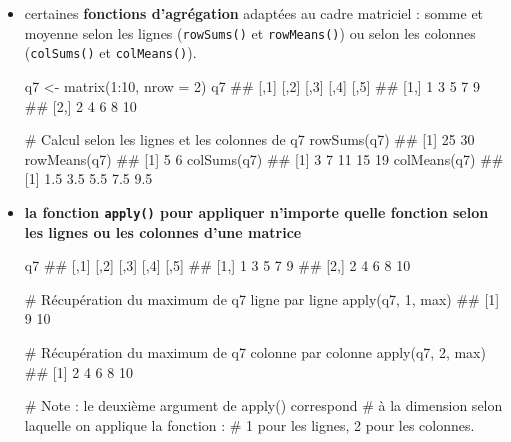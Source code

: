 \documentclass[12pt,twosided, notitlepage]{book}
\newenvironment{Shaded}{}{}
\newcommand{\KeywordTok}[1]{\textcolor[rgb]{0.00,0.00,1.00}{{#1}}}
\newcommand{\DataTypeTok}[1]{{#1}}
\newcommand{\DecValTok}[1]{{#1}}
\newcommand{\StringTok}[1]{\textcolor[rgb]{0.00,0.50,0.50}{{#1}}}
\newcommand{\CommentTok}[1]{\textcolor[rgb]{0.00,0.50,0.00}{{#1}}}
\newcommand{\NormalTok}[1]{{#1}}
\renewenvironment{Shaded}{\begin{snugshade}}{\end{snugshade}}
\begin{document}
\begin{itemize}
\begin{Shaded}
\end{Shaded}
\item
  certaines \textbf{fonctions d'agrégation} adaptées au cadre matriciel
  : somme et moyenne selon les lignes
  (\texttt{rowSums()} et
  \texttt{rowMeans()}) ou selon les
  colonnes (\texttt{colSums()} et
  \texttt{colMeans()}).

\begin{Shaded}
\begin{Highlighting}[]
\NormalTok{q7 <-}\StringTok{ }\KeywordTok{matrix}\NormalTok{(}\DecValTok{1}\NormalTok{:}\DecValTok{10}\NormalTok{, }\DataTypeTok{nrow =} \DecValTok{2}\NormalTok{)}
\NormalTok{q7}
  \NormalTok{##      [,1] [,2] [,3] [,4] [,5]}
  \NormalTok{## [1,]    1    3    5    7    9}
  \NormalTok{## [2,]    2    4    6    8   10}

\CommentTok{# Calcul selon les lignes et les colonnes de q7}
\KeywordTok{rowSums}\NormalTok{(q7)}
  \NormalTok{## [1] 25 30}
\KeywordTok{rowMeans}\NormalTok{(q7)}
  \NormalTok{## [1] 5 6}
\KeywordTok{colSums}\NormalTok{(q7)}
  \NormalTok{## [1]  3  7 11 15 19}
\KeywordTok{colMeans}\NormalTok{(q7)}
  \NormalTok{## [1] 1.5 3.5 5.5 7.5 9.5}
\end{Highlighting}
\end{Shaded}
\item
  \textbf{la fonction \texttt{apply()} pour appliquer n'importe quelle
  fonction selon les lignes ou les colonnes d'une
  matrice}

\begin{Shaded}
\begin{Highlighting}[]
\NormalTok{q7}
  \NormalTok{##      [,1] [,2] [,3] [,4] [,5]}
  \NormalTok{## [1,]    1    3    5    7    9}
  \NormalTok{## [2,]    2    4    6    8   10}

\CommentTok{# Récupération du maximum de q7 ligne par ligne}
\KeywordTok{apply}\NormalTok{(q7, }\DecValTok{1}\NormalTok{, max)}
  \NormalTok{## [1]  9 10}

\CommentTok{# Récupération du maximum de q7 colonne par colonne}
\KeywordTok{apply}\NormalTok{(q7, }\DecValTok{2}\NormalTok{, max)}
  \NormalTok{## [1]  2  4  6  8 10}

\CommentTok{# Note : le deuxième argument de apply() correspond }
\CommentTok{# à la dimension selon laquelle on applique la fonction : }
\CommentTok{# 1 pour les lignes, 2 pour les colonnes.}
\end{Highlighting}
\end{Shaded}
\end{itemize}
\end{document}
